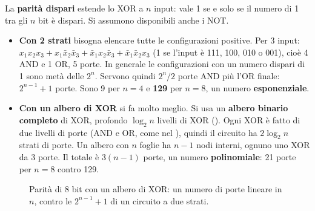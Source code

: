 \begin{esempio}
La \textbf{parità dispari} estende lo XOR a $n$ input: vale 1 se e solo se il numero di 1 tra gli $n$ bit è dispari.
Si assumono disponibili anche i NOT.
\begin{itemize}
  \item \textbf{Con 2 strati} bisogna elencare tutte le configurazioni positive. Per 3 input:
        $x_1x_2x_3 + x_1\bar x_2\bar x_3 + \bar x_1x_2\bar x_3 + \bar x_1\bar x_2x_3$ (1 se l'input è 111, 100, 010 o
        001), cioè 4 AND e 1 OR, 5 porte. In generale le configurazioni con un numero dispari di 1 sono metà delle
        $2^n$. Servono quindi $2^n/2$ porte AND più l'OR finale: $2^{n-1}+1$ porte. Sono 9 per $n=4$ e \textbf{129}
        per $n=8$, un numero \textbf{esponenziale}.
  \item \textbf{Con un albero di XOR} si fa molto meglio. Si usa un \textbf{albero binario completo} di XOR, profondo
        $\log_2 n$ livelli di XOR (). Ogni XOR è fatto di due livelli di porte (AND e OR, come nel
        ), quindi il circuito ha $2\log_2 n$ strati di porte. Un albero con $n$ foglie ha $n-1$ nodi
        interni, ognuno uno XOR da 3 porte. Il totale è $3(n-1)$ porte, un numero \textbf{polinomiale}: 21 porte
        per $n=8$ contro 129.
\end{itemize}
\end{esempio}

\begin{figure}[ht]
\centering
{}
\caption{Parità di 8 bit con un albero di XOR: un numero di porte lineare in $n$, contro le $2^{n-1}+1$ di un
circuito a due strati.}
\label{fig:parita}
\end{figure}

